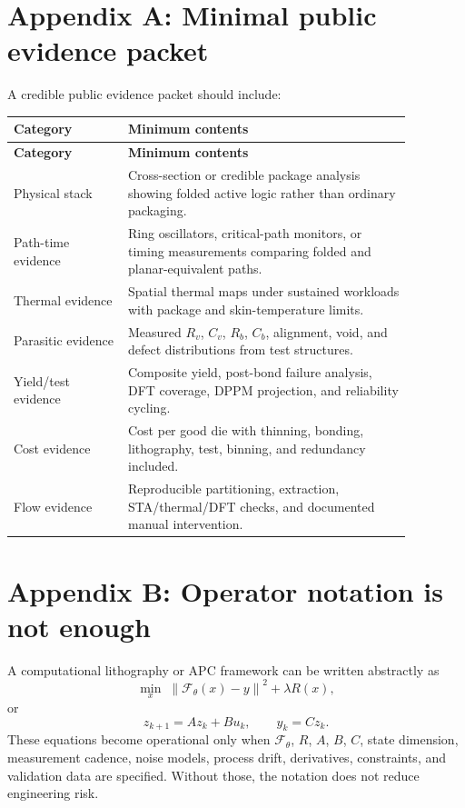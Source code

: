 \documentclass[11pt]{article}
\newcommand{\norm}[1]{\left\lVert #1 \right\rVert}
\begin{document}
\section*{Appendix A: Minimal public evidence packet}
A credible public evidence packet should include:
\begin{longtable}{p{0.25\linewidth}p{0.62\linewidth}}
\toprule
\textbf{Category} & \textbf{Minimum contents}\\
\midrule
\endfirsthead
\toprule
\textbf{Category} & \textbf{Minimum contents}\\
\midrule
\endhead
Physical stack & Cross-section or credible package analysis showing folded active logic rather than ordinary packaging.\\
Path-time evidence & Ring oscillators, critical-path monitors, or timing measurements comparing folded and planar-equivalent paths.\\
Thermal evidence & Spatial thermal maps under sustained workloads with package and skin-temperature limits.\\
Parasitic evidence & Measured $R_v$, $C_v$, $R_b$, $C_b$, alignment, void, and defect distributions from test structures.\\
Yield/test evidence & Composite yield, post-bond failure analysis, DFT coverage, DPPM projection, and reliability cycling.\\
Cost evidence & Cost per good die with thinning, bonding, lithography, test, binning, and redundancy included.\\
Flow evidence & Reproducible partitioning, extraction, STA/thermal/DFT checks, and documented manual intervention.\\
\bottomrule
\end{longtable}

\section*{Appendix B: Operator notation is not enough}
A computational lithography or APC framework can be written abstractly as
\begin{equation}
\min_x \; \norm{\mathcal{F}_{\theta}(x)-y}^{2}+\lambda R(x),
\end{equation}
or
\begin{equation}
z_{k+1}=Az_k+Bu_k, \qquad y_k=Cz_k.
\end{equation}
These equations become operational only when $\mathcal{F}_{\theta}$, $R$, $A$, $B$, $C$, state dimension, measurement cadence, noise models, process drift, derivatives, constraints, and validation data are specified. Without those, the notation does not reduce engineering risk.
\end{document}
